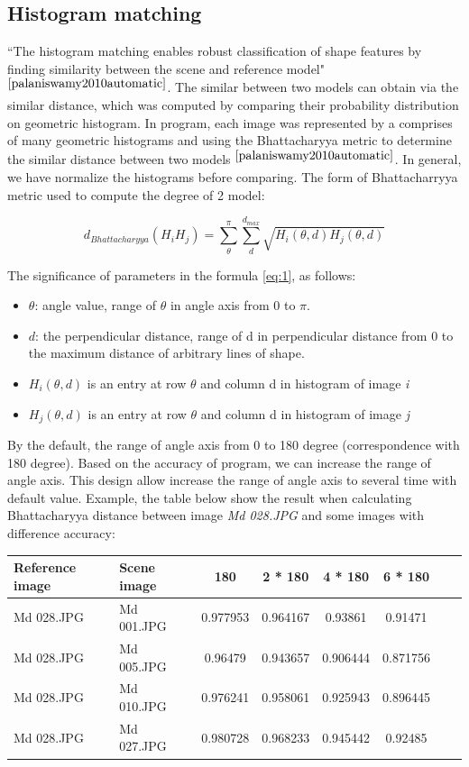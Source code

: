 \subsection{Histogram matching}
``The histogram matching enables robust classification of shape features by finding similarity between the scene and reference model"$^{\cite{palaniswamy2010automatic}}$. The similar between two models can obtain via the similar distance, which was computed by comparing their probability distribution on geometric histogram. In program, each image was represented by a comprises of many geometric histograms and using the Bhattacharyya metric to determine the similar distance between two models $^{\cite{palaniswamy2010automatic}}$. In general, we have normalize the histograms before comparing. The form of Bhattacharryya metric used to compute the degree of 2 model:
\begin{center}
\begin{equation} \label{eq:1}
d_{Bhattacharyya} (H_{i}H_{j}) = \sum\limits_{\theta}^{\pi}\sum\limits_{d}^{d_{max}}\sqrt{H_{i}(\theta,d)H_{j}(\theta,d)}
\end{equation}
\end{center}
The significance of parameters in the formula \ref{eq:1}, as follows:
\begin{itemize}
\item $\theta$: angle value, range of $\theta$ in angle axis from 0 to $\pi$.
\item $d$: the perpendicular distance, range of d in perpendicular distance from 0 to the maximum distance of arbitrary lines of shape.
\item $H_{i}(\theta,d)$ is an entry at row $\theta$ and column d in histogram of image \textit{i}
\item $H_{j}(\theta,d)$ is an entry at row $\theta$ and column d in histogram of image \textit{j}
\end{itemize}
By the default, the range of angle axis from 0 to 180 degree (correspondence with 180 degree). Based on the accuracy of program, we can increase the range of angle axis. This design allow increase the range of angle axis to several time with default value. Example, the table below show the result when calculating Bhattacharyya distance between image \textit{Md 028.JPG} and some images with difference accuracy:
\begin{center}
\begin{tabular}{|l|l|c|c|c|c|c|c|}
\hline
Reference image & Scene image & 180 & 2 * 180 & 4 * 180 & 6 * 180 \\ \hline
Md 028.JPG & Md 001.JPG & 0.977953 & 0.964167 & 0.93861 & 0.91471 \\ \hline
Md 028.JPG & Md 005.JPG & 0.96479 & 0.943657 & 0.906444 & 0.871756  \\ \hline
Md 028.JPG & Md 010.JPG & 0.976241 & 0.958061 & 0.925943 & 0.896445 \\ \hline
Md 028.JPG & Md 027.JPG & 0.980728 & 0.968233 & 0.945442 & 0.92485 \\ \hline
\end{tabular}
\end{center}

